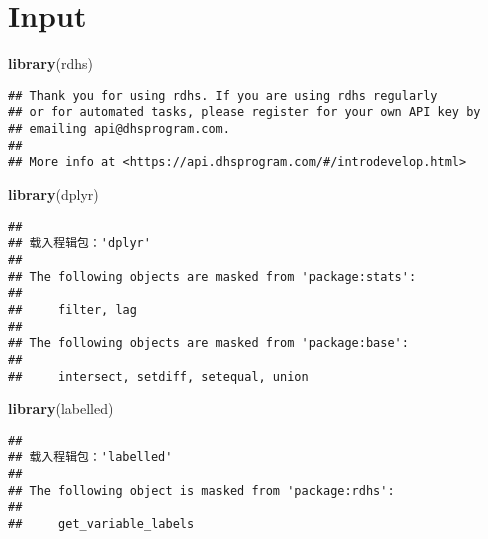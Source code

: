 \documentclass[
]{article}
\author{}
\date{\vspace{-2.5em}}
\newenvironment{Shaded}{\begin{snugshade}}{\end{snugshade}}
\newcommand{\FunctionTok}[1]{\textcolor[rgb]{0.13,0.29,0.53}{\textbf{#1}}}
\newcommand{\NormalTok}[1]{#1}
\begin{document}
\hypertarget{input}{%
\section{Input}\label{input}}

\begin{Shaded}
\begin{Highlighting}[]
\FunctionTok{library}\NormalTok{(rdhs)}
\end{Highlighting}
\end{Shaded}

\begin{verbatim}
## Thank you for using rdhs. If you are using rdhs regularly
## or for automated tasks, please register for your own API key by
## emailing api@dhsprogram.com. 
## 
## More info at <https://api.dhsprogram.com/#/introdevelop.html>
\end{verbatim}

\begin{Shaded}
\begin{Highlighting}[]
\FunctionTok{library}\NormalTok{(dplyr)}
\end{Highlighting}
\end{Shaded}

\begin{verbatim}
## 
## 载入程辑包：'dplyr'
## 
## The following objects are masked from 'package:stats':
## 
##     filter, lag
## 
## The following objects are masked from 'package:base':
## 
##     intersect, setdiff, setequal, union
\end{verbatim}

\begin{Shaded}
\begin{Highlighting}[]
\FunctionTok{library}\NormalTok{(labelled)}
\end{Highlighting}
\end{Shaded}

\begin{verbatim}
## 
## 载入程辑包：'labelled'
## 
## The following object is masked from 'package:rdhs':
## 
##     get_variable_labels
\end{verbatim}
\end{document}
